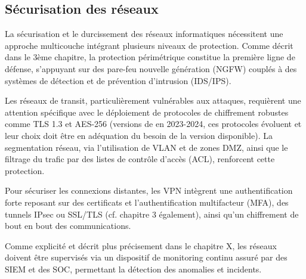 \subsection{Sécurisation des réseaux}

La sécurisation et le durcissement des réseaux informatiques nécessitent une approche multicouche intégrant plusieurs niveaux de protection. Comme décrit dans le 3ème chapitre, la protection périmétrique constitue la première ligne de défense, s'appuyant sur des pare-feu nouvelle génération (NGFW) couplés à des systèmes de détection et de prévention d'intrusion (IDS/IPS).

Les réseaux de transit, particulièrement vulnérables aux attaques, requièrent une attention spécifique avec le déploiement de protocoles de chiffrement robustes comme TLS 1.3 et AES-256 (versions de en 2023-2024, ces protocoles évoluent et leur choix doit être en adéquation du besoin de la version disponible). La segmentation réseau, via l'utilisation de VLAN et de zones DMZ, ainsi que le filtrage du trafic par des listes de contrôle d'accès (ACL), renforcent cette protection.

Pour sécuriser les connexions distantes, les VPN intègrent une authentification forte reposant sur des certificats et l'authentification multifacteur (MFA), des tunnels IPsec ou SSL/TLS (cf. chapitre 3 également), ainsi qu'un chiffrement de bout en bout des communications.

Comme explicité et décrit plus précisement dans le chapitre X, les réseaux doivent être supervisés via un dispositif de monitoring continu assuré par des SIEM et des SOC, permettant la détection des anomalies et incidents.


